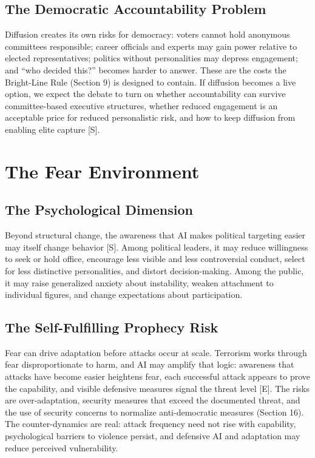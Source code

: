\documentclass[11pt,letterpaper]{article}
\begin{document}
\subsection{The Democratic Accountability Problem}

Diffusion creates its own risks for democracy: voters cannot hold anonymous committees responsible; career officials and experts may gain power relative to elected representatives; politics without personalities may depress engagement; and ``who decided this?'' becomes harder to answer. These are the costs the Bright-Line Rule (Section 9) is designed to contain. If diffusion becomes a live option, we expect the debate to turn on whether accountability can survive committee-based executive structures, whether reduced engagement is an acceptable price for reduced personalistic risk, and how to keep diffusion from enabling elite capture [S].

\section{The Fear Environment}

\subsection{The Psychological Dimension}

Beyond structural change, the awareness that AI makes political targeting easier may itself change behavior [S]. Among political leaders, it may reduce willingness to seek or hold office, encourage less visible and less controversial conduct, select for less distinctive personalities, and distort decision-making. Among the public, it may raise generalized anxiety about instability, weaken attachment to individual figures, and change expectations about participation.

\subsection{The Self-Fulfilling Prophecy Risk}

Fear can drive adaptation before attacks occur at scale. Terrorism works through fear disproportionate to harm, and AI may amplify that logic: awareness that attacks have become easier heightens fear, each successful attack appears to prove the capability, and visible defensive measures signal the threat level [E]. The risks are over-adaptation, security measures that exceed the documented threat, and the use of security concerns to normalize anti-democratic measures (Section 16). The counter-dynamics are real: attack frequency need not rise with capability, psychological barriers to violence persist, and defensive AI and adaptation may reduce perceived vulnerability.
\end{document}
